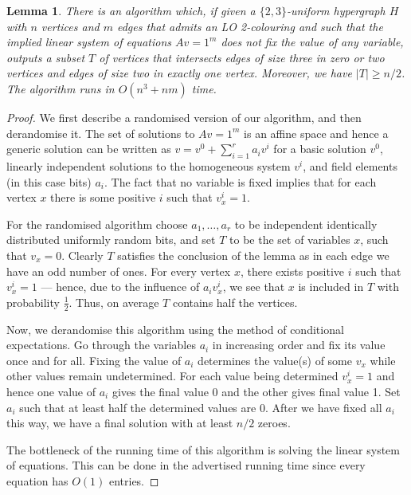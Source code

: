 \documentclass[10pt,a4paper]{article}
\theoremstyle{plain}
\newtheorem{lemma}[theorem]{Lemma}
\theoremstyle{definition}
\begin{document}
\begin{lemma}\label{lem:innerstep}
    There is an algorithm which, if given a $\{2, 3\}$-uniform hypergraph $H$ with $n$ vertices and
    $m$ edges that admits an LO 2-colouring and such that the implied linear
    system of equations $Av=1^m$ does not fix the value of any variable, outputs a subset $T$ of vertices that intersects edges of size three in zero or two vertices and edges of size two in exactly one vertex.
    Moreover, we have  $\vert T\vert \geq n / 2$. The algorithm runs in $O(n^3 + nm)$ time.
\end{lemma}

\begin{proof}

    We first describe a randomised version of our algorithm, and then derandomise
    it. The set of solutions to $Av=1^m$ is an affine space and hence a generic solution can be written as $v=v^0+\sum_{i=1}^r a_i v^i$ for a basic solution $v^0$, linearly independent solutions to the homogeneous system $v^i$, and field elements (in this case bits) $a_i$.
    The fact that no variable is fixed implies that for each vertex $x$ there is 
    some positive $i$ such that $v^i_x=1$.
    
     For the randomised algorithm choose $a_1, \ldots, a_r$ to be independent identically distributed uniformly random bits, and set $T$ to be 
     the set of variables $x$, such that $v_x=0$.  Clearly $T$ satisfies
     the conclusion of the lemma as in each edge we have an odd number of ones. 
     For every vertex $x$, there exists positive $i$ such that $v_x^i = 1$ --- hence, due to the influence of $a_i v_x^i$, we see that $x$ is included in $T$ with probability $\frac{1}{2}$.
     Thus, on average $T$ contains half the vertices.

    Now, we derandomise this algorithm using the method of conditional
    expectations. Go through the variables $a_i$ in increasing order and 
    fix its value once and for all.  Fixing the value of $a_i$ determines
    the value(s) of some $v_x$ while other values remain undetermined.  For each
    value being determined $v_x^i=1$ and hence one value of $a_i$ gives
    the final value 0 and the other gives final value 1.  Set $a_i$ such
    that at least half the determined values are 0.  After we have 
    fixed all $a_i$ this way, we have a final solution with at least
    $n/2$ zeroes.
    
    The bottleneck of the running time of this algorithm is solving the linear system of equations. This can be done in the advertised running time since every equation has $O(1)$ entries. 
\end{proof}
\end{document}
